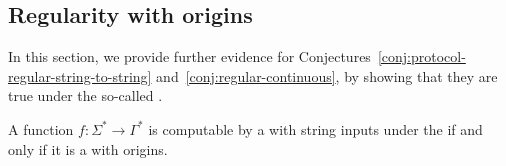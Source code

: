 \subsection{Regularity with origins}
\label{sec:origin-semantics}

In this section, we provide further evidence for
Conjectures~\ref{conj:protocol-regular-string-to-string}
and~\ref{conj:regular-continuous}, by showing that they are true under the
so-called 
\cite{bojanczykTransducersOriginInformation2014}.

\begin{theorem}
  \label{thm:origin-string-to-string}
  A function $f: \Sigma^* \to \Gamma^*$ is computable by a
   with string inputs under the  if and only if
  it is a  with origins.
\end{theorem}


